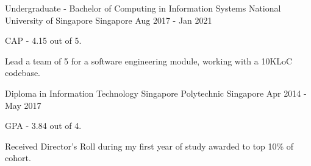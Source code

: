 

\begin{cventries}

  \cventry
    {Undergraduate - Bachelor of Computing in Information Systems} %
    {National University of Singapore} %
    {Singapore} %
    {Aug 2017 - Jan 2021} %
    {
      \begin{cvitems} %
        \item {CAP - 4.15 out of 5.}
        \item {Lead a team of 5 for a software engineering module, working with a 10KLoC codebase.}
      \end{cvitems}
    }

  \cventry
    {Diploma in Information Technology} %
    {Singapore Polytechnic} %
    {Singapore} %
    {Apr 2014 - May 2017} %
    {
      \begin{cvitems} %
        \item {GPA - 3.84 out of 4.}
        \item {Received Director's Roll during my first year of study awarded to top 10\% of cohort.}
      \end{cvitems}
    }

\end{cventries}
